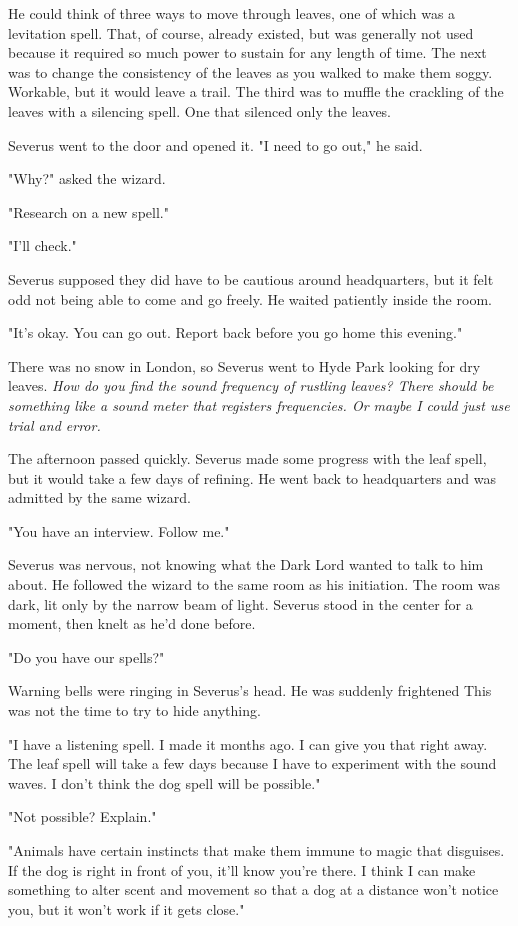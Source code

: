 \documentclass[a4paper,11pt]{article}
\begin{document}
He could think of three ways to move through leaves, one of which was a levitation spell. That, of course, already existed, but was generally not used because it required so much power to sustain for any length of time. The next was to change the consistency of the leaves as you walked to make them soggy. Workable, but it would leave a trail. The third was to muffle the crackling of the leaves with a silencing spell. One that silenced only the leaves.

Severus went to the door and opened it. "I need to go out," he said.

"Why?" asked the wizard.

"Research on a new spell."

"I'll check."

Severus supposed they did have to be cautious around headquarters, but it felt odd not being able to come and go freely. He waited patiently inside the room.

"It's okay. You can go out. Report back before you go home this evening."

There was no snow in London, so Severus went to Hyde Park looking for dry leaves. \emph{How do you find the sound frequency of rustling leaves? There should be something like a sound meter that registers frequencies. Or maybe I could just use trial and error.}

The afternoon passed quickly. Severus made some progress with the leaf spell, but it would take a few days of refining. He went back to headquarters and was admitted by the same wizard.

"You have an interview. Follow me."

Severus was nervous, not knowing what the Dark Lord wanted to talk to him about. He followed the wizard to the same room as his initiation. The room was dark, lit only by the narrow beam of light. Severus stood in the center for a moment, then knelt as he'd done before.

"Do you have our spells?"

Warning bells were ringing in Severus's head. He was suddenly frightened This was not the time to try to hide anything.

"I have a listening spell. I made it months ago. I can give you that right away. The leaf spell will take a few days because I have to experiment with the sound waves. I don't think the dog spell will be possible."

"Not possible? Explain."

"Animals have certain instincts that make them immune to magic that disguises. If the dog is right in front of you, it'll know you're there. I think I can make something to alter scent and movement so that a dog at a distance won't notice you, but it won't work if it gets close."
\end{document}
